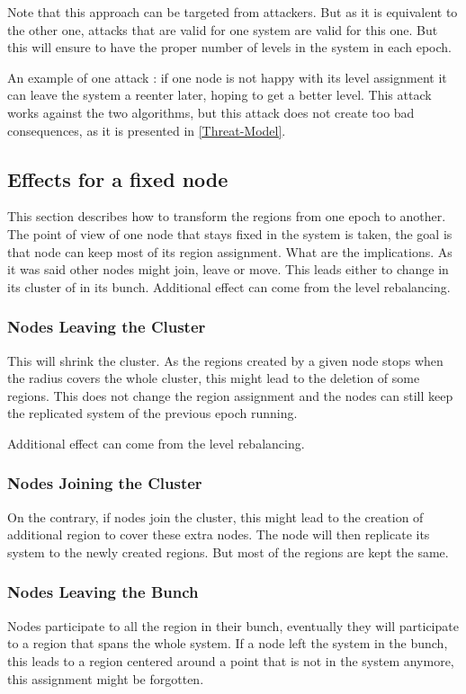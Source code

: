 \documentclass[a4paper,11pt,oneside]{report}
\begin{document}
Note that this approach can be targeted from attackers. But as it is equivalent
to the other one, attacks that are valid for one system are valid for this one.
But this will ensure to have the proper number of levels in the system in each
epoch.

An example of one attack : if one node is not happy with its level assignment
it can leave the system a reenter later, hoping to get a better level. This
attack works against the two algorithms, but this attack does not create too
bad consequences, as it is presented in \ref{Threat-Model}.

\subsection{Effects for a fixed node}
This section describes how to transform the regions from one epoch to another.
The point of view of one node that stays fixed in the system is taken, the goal
is that node can keep most of its region assignment.  What are the
implications. As it was said other nodes might join, leave or move. This leads
either to change in its cluster of in its bunch. 
Additional effect can come from the level rebalancing. 

\subsubsection{Nodes Leaving the Cluster} 
This will shrink the cluster. As the regions created by a given node stops when
the radius covers the whole cluster, this might lead to the deletion of some
regions. This does not change the
region assignment and the nodes can still keep the replicated system of the
previous epoch running.

Additional effect can come from the level rebalancing. 

\subsubsection{Nodes Joining the Cluster} 
On the contrary, if nodes join the cluster, this might lead to the creation of
additional region to cover these extra nodes. The node will then replicate its
system to the newly created regions. But most of the regions are kept the same.

\subsubsection{Nodes Leaving the Bunch} 
Nodes participate to all the region in their bunch, eventually they will
participate to a region that spans the whole system. If a node left the system
in the bunch,  this leads to a region centered around a point that is not in
the system anymore, this assignment might be forgotten. 
\end{document}

